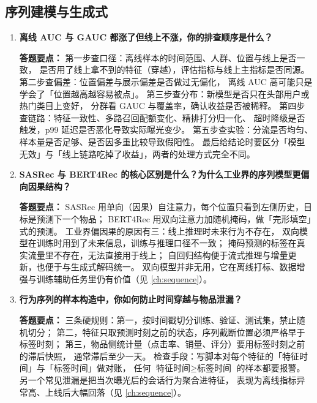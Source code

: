 \begin{interview}[题库与答题要点]
\begin{enumerate}[label=]
\end{enumerate}

\end{interview}

\subsection{序列建模与生成式}

\begin{interview}[题库与答题要点]

\begin{enumerate}[label=]

  \item[\textcolor{VioletDeep}{\textbf{Q21.}}] \textbf{离线 AUC 与 GAUC 都涨了但线上不涨，你的排查顺序是什么？}
\par\smallskip\noindent\textcolor{VioletDeep}{\textbf{答题要点：}}
第一步查口径：离线样本的时间范围、人群、位置与线上是否一致，
是否用了线上拿不到的特征（穿越），评估指标与线上主指标是否同源。
第二步查偏差：位置偏差与展示偏差是否做过无偏化，
离线 AUC 高可能只是学会了「位置越高越容易被点」。
第三步查分布：新模型是否只在头部用户或热门类目上变好，
分群看 GAUC 与覆盖率，确认收益是否被稀释。
第四步查链路：特征一致性、多路召回配额变化、精排打分归一化、
超时降级是否触发，p99 延迟是否恶化导致实际曝光变少。
第五步查实验：分流是否均匀、样本量是否足够、是否因多重比较导致假阳性。
最后给结论时要区分「模型无效」与「线上链路吃掉了收益」，两者的处理方式完全不同。

  \item[\textcolor{VioletDeep}{\textbf{Q22.}}] \textbf{SASRec 与 BERT4Rec 的核心区别是什么？为什么工业界的序列模型更偏向因果结构？}
\par\smallskip\noindent\textcolor{VioletDeep}{\textbf{答题要点：}}
SASRec 用单向（因果）自注意力，每个位置只看到左侧历史，目标是预测下一个物品；
BERT4Rec 用双向注意力加随机掩码，做「完形填空」式的预测。
工业界偏因果的原因有三：线上推理时未来行为不存在，
双向模型在训练时用到了未来信息，训练与推理口径不一致；
掩码预测的标签在真实流量里不存在，无法直接用于线上；
自回归结构便于流式推理与增量更新，也便于与生成式解码统一。
双向模型并非无用，它在离线打标、数据增强与训练辅助任务里仍有价值（见 \cref{ch:sequence}）。

  \item[\textcolor{VioletDeep}{\textbf{Q23.}}] \textbf{行为序列的样本构造中，你如何防止时间穿越与物品泄漏？}
\par\smallskip\noindent\textcolor{VioletDeep}{\textbf{答题要点：}}
三条硬规则：第一，按时间戳切分训练、验证、测试集，禁止随机切分；
第二，特征只取预测时刻之前的状态，序列截断位置必须严格早于标签时刻；
第三，物品侧统计量（点击率、销量、评分）要用标签时刻之前的滞后快照，
通常滞后至少一天。
检查手段：写脚本对每个特征的「特征时间」与「标签时间」做对账，
任何 $\text{特征时间} \ge \text{标签时间}$ 的样本都要报警。
另一个常见泄漏是把当次曝光后的会话行为聚合进特征，
表现为离线指标异常高、上线后大幅回落（见 \cref{ch:sequence}）。


\end{enumerate}
\end{interview}
